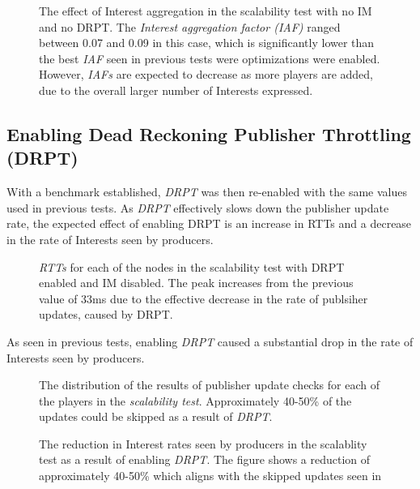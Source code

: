 \begin{figure}[H]
    \centering
    \caption{The effect of Interest aggregation in the scalability test with no IM and no DRPT. The \textit{Interest aggregation factor (IAF)} ranged between 0.07 and 0.09 in this case, which is significantly lower than the best \textit{IAF} seen in previous tests were optimizations were enabled. However, \textit{IAFs} are expected to decrease as more players are added, due to the overall larger number of Interests expressed.}
    \label{fig:eval:no-im-no-dr:int-agg}
\end{figure}


\subsection{Enabling Dead Reckoning Publisher Throttling (DRPT)}
With a benchmark established, \textit{DRPT} was then re-enabled with the same values used in previous tests. As \textit{DRPT} effectively slows down the publisher update rate, the expected effect of enabling DRPT is an increase in RTTs and a decrease in the rate of Interests seen by producers.

\begin{figure}[H]
    \centering
    \caption{\textit{RTTs} for each of the nodes in the scalability test with DRPT enabled and IM disabled. The peak increases from the previous value of 33ms due to the effective decrease in the rate of publsiher updates, caused by DRPT.}
    \label{fig:eval:dr:agg-packet-times}
\end{figure}

As seen in previous tests, enabling \textit{DRPT} caused a substantial drop in the rate of Interests seen by producers. 

\begin{figure}[H]
    \centering
    \caption{The distribution of the results of publisher update checks for each of the players in the \textit{scalability test}. Approximately 40-50\% of the updates could be skipped as a result of \textit{DRPT}.}
    \label{fig:eval:dr:dr-pub-throt}
\end{figure}


\begin{figure}[H]
    \centering
    \caption{The reduction in Interest rates seen by producers in the scalablity test as a result of enabling \textit{DRPT}. The figure shows a reduction of approximately 40-50\% which aligns with the skipped updates seen in }
    \label{fig:eval:dr:interest-rate-impacts}
\end{figure}


